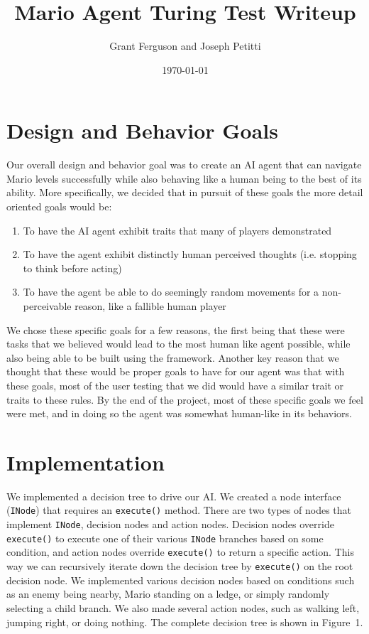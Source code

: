 \documentclass[a4paper, 10pt]{article}
\title{Mario Agent Turing Test Writeup}
\author{Grant Ferguson and Joseph Petitti}
\date{\today}
\begin{document}
\maketitle

\section{Design and Behavior Goals}

Our overall design and behavior goal was to create an AI agent that can navigate
Mario levels successfully while also behaving like a human being to the best of
its ability. More specifically, we decided that in pursuit of these goals the
more detail oriented goals would be:

\begin{enumerate}
	\item To have the AI agent exhibit traits that many of players demonstrated
	\item To have the agent exhibit distinctly human perceived thoughts (i.e.
		stopping to think before acting)
	\item To have the agent be able to do seemingly random movements for a
		non-perceivable reason, like a fallible human player
\end{enumerate}

We chose these specific goals for a few reasons, the first being that these were
tasks that we believed would lead to the most human like agent possible, while
also being able to be built using the framework. Another key reason that we
thought that these would be proper goals to have for our agent was that with
these goals, most of the user testing that we did would have a similar trait or
traits to these rules. By the end of the project, most of these specific goals
we feel were met, and in doing so the agent was somewhat human-like in its
behaviors.

\section{Implementation}

We implemented a decision tree to drive our AI. We created a node interface
(\texttt{INode}) that requires an \texttt{execute()} method. There are two types
of nodes that implement \texttt{INode}, decision nodes and action nodes.
Decision nodes override \texttt{execute()} to execute one of their various
\texttt{INode} branches based on some condition, and action nodes override
\texttt{execute()} to return a specific action. This way we can recursively
iterate down the decision tree by \texttt{execute()} on the root decision node.
We implemented various decision nodes based on conditions such as an enemy being
nearby, Mario standing on a ledge, or simply randomly selecting a child branch.
We also made several action nodes, such as walking left, jumping right, or doing
nothing. The complete decision tree is shown in Figure~1.
\end{document}
